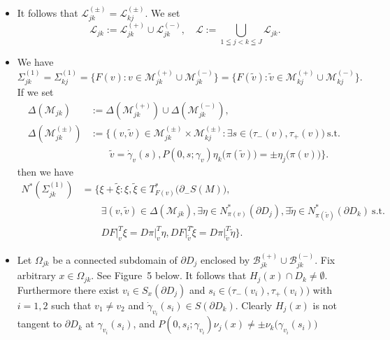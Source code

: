\documentclass[a4paper,11pt,reqno]{amsart}
\numberwithin{equation}{section}
\theoremstyle{definition}
\theoremstyle{remark}
\begin{document}
\begin{itemize}
\item  
It follows that $\mathcal{L}_{jk}^{(\pm)}=\mathcal{L}_{kj}^{(\pm)}$. 
We set 
%
%
$$
\mathcal{L}_{jk}:=\mathcal{L}_{jk}^{(+)}\cup\mathcal{L}_{jk}^{(-)}, 
\quad
\mathcal{L}
:=
\bigcup_{1 \leqq j < k \leqq J}
\mathcal{L}_{jk}.
$$
%
%
\item 
We have 
%
%
$$
\Sigma_{jk}^{(1)}
=
\Sigma_{kj}^{(1)}
=
\bigl\{
F(v) : 
v \in \mathcal{M}_{jk}^{(+)}\cup\mathcal{M}_{jk}^{(-)}
\bigr\}
=
\bigl\{
F(\tilde{v}) : 
\tilde{v} \in \mathcal{M}_{kj}^{(+)}\cup\mathcal{M}_{kj}^{(-)}
\bigr\}. 
$$
%
%
If we set 
%
%
\begin{align*}
  \Delta(\mathcal{M}_{jk})
& :=
  \Delta(\mathcal{M}_{jk}^{(+)})\cup\Delta(\mathcal{M}_{jk}^{(-)}),
\\
  \Delta(\mathcal{M}_{jk}^{(\pm)})
& :=
  \bigl\{
  (v,\tilde{v})\in \mathcal{M}_{jk}^{(\pm)}\times\mathcal{M}_{kj}^{(\pm)}:
  \exists s\in\bigl(\tau_-(v),\tau_+(v)\bigr) 
  \ \text{s.t.}\ 
\\
& \qquad
  \tilde{v}=\dot{\gamma}_v(s), 
  P(0,s;\gamma_v)\eta_k\bigl(\pi(\tilde{v})\bigr)=\pm\eta_j\bigl(\pi(v)\bigr)
\bigr\}. 
\end{align*}
%
%
then we have 
%
%
\begin{align}
  N^\ast(\Sigma_{jk}^{(1)})
& =
  \bigl\{
  \xi+\tilde{\xi}:
  \xi,\tilde{\xi} \in T^\ast_{F(v)}\bigl(\partial_-S(M)\bigr), 
\nonumber
\\
& \qquad 
  \exists (v,\tilde{v}) \in \Delta(\mathcal{M}_{jk}), 
  \exists \eta \in N^\ast_{\pi(v)}(\partial{D_j}), 
  \exists \tilde{\eta} \in N^\ast_{\pi(\tilde{v})}(\partial{D_k})
  \ \text{s.t.}\ 
\nonumber
\\
& \qquad
  DF\vert^T_v\xi=D\pi\vert^T_v\eta, 
  DF\vert^T_{\tilde{v}}\tilde{\xi}=D\pi\vert^T_{\tilde{v}}\tilde{\eta} 
  \bigr\}.
\label{equation:nstarsigmajk1} 
\end{align}
%
%
\item 
Let $\Omega_{jk}$ be a connected subdomain of $\partial{D_j}$ 
enclosed by $\mathcal{B}_{jk}^{(+)}\cup\mathcal{B}_{jk}^{(-)}$. 
Fix arbitrary $x \in \Omega_{jk}$. 
See Figure~5 below. 
It follows that $H_j(x) \cap D_k \ne \emptyset$. 
Furthermore there exist 
$v_i \in S_x(\partial{D_j})$ and 
$s_i\in\bigl(\tau_-(v_i),\tau_+(v_i)\bigr)$ 
with $i=1,2$ such that $v_1 \ne v_2$ and 
$\dot{\gamma}_{v_i}(s_i) \in S(\partial{D_k})$. 
Clearly $H_j(x)$ is not tangent to $\partial{D_k}$ 
at $\gamma_{v_i}(s_i)$, and 
$P(0,s_i;\gamma_{v_i})\nu_j(x) \ne \pm\nu_k\bigl(\gamma_{v_i}(s_i)\bigr)$ 

\end{itemize}
\end{document}
